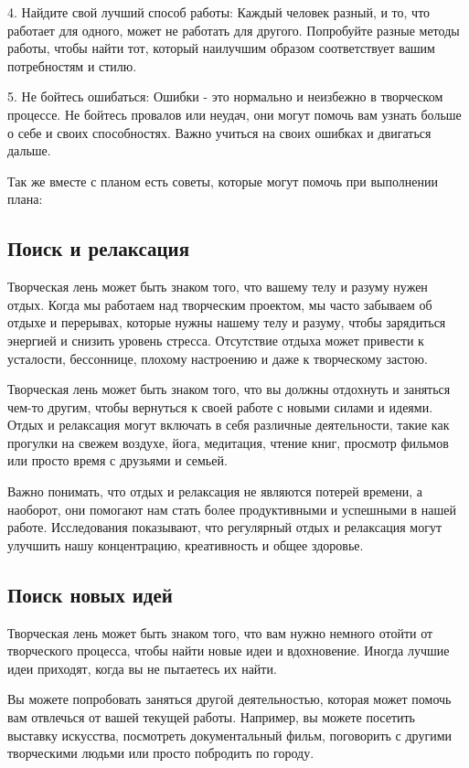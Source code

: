 \documentclass[a4paper, 14pt]{article}
\begin{document}
4. Найдите свой лучший способ работы: Каждый человек разный, и то, что работает для одного, может не работать для другого. Попробуйте разные методы работы, чтобы найти тот, который наилучшим образом соответствует вашим потребностям и стилю.

5. Не бойтесь ошибаться: Ошибки - это нормально и неизбежно в творческом процессе. Не бойтесь провалов или неудач, они могут помочь вам узнать больше о себе и своих способностях. Важно учиться на своих ошибках и двигаться дальше.

Так же вместе с планом есть советы, которые могут помочь при выполнении плана:

\subsection{Поиск и релаксация}
Творческая лень может быть знаком того, что вашему телу и разуму нужен отдых. Когда мы работаем над творческим проектом, мы часто забываем об отдыхе и перерывах, которые нужны нашему телу и разуму, чтобы зарядиться энергией и снизить уровень стресса. Отсутствие отдыха может привести к усталости, бессоннице, плохому настроению и даже к творческому застою. 

Творческая лень может быть знаком того, что вы должны отдохнуть и заняться чем-то другим, чтобы вернуться к своей работе с новыми силами и идеями. Отдых и релаксация могут включать в себя различные деятельности, такие как прогулки на свежем воздухе, йога, медитация, чтение книг, просмотр фильмов или просто время с друзьями и семьей. 

Важно понимать, что отдых и релаксация не являются потерей времени, а наоборот, они помогают нам стать более продуктивными и успешными в нашей работе. Исследования показывают, что регулярный отдых и релаксация могут улучшить нашу концентрацию, креативность и общее здоровье. 

\subsection{Поиск новых идей}

Творческая лень может быть знаком того, что вам нужно немного отойти от творческого процесса, чтобы найти новые идеи и вдохновение. Иногда лучшие идеи приходят, когда вы не пытаетесь их найти. 

Вы можете попробовать заняться другой деятельностью, которая может помочь вам отвлечься от вашей текущей работы. Например, вы можете посетить выставку искусства, посмотреть документальный фильм, поговорить с другими творческими людьми или просто побродить по городу. 
\end{document}
